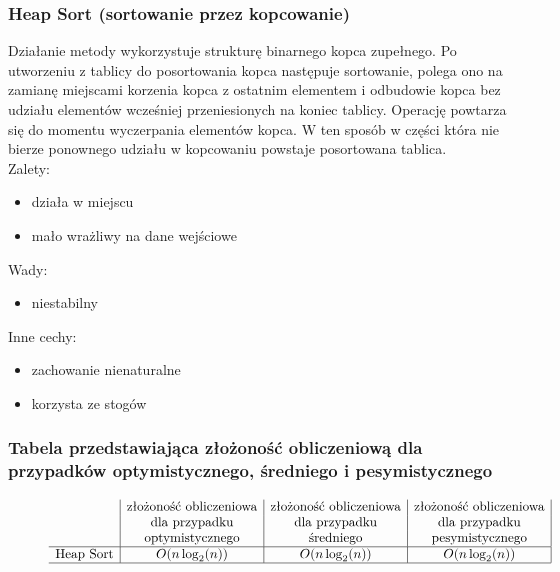 \documentclass[polish,polish,a4paper]{article}
\begin{document}
\begin{spacing}{1.5}
			\subsubsection*{Heap Sort (sortowanie przez kopcowanie)}
			Działanie metody wykorzystuje strukturę binarnego kopca zupełnego. Po utworzeniu z tablicy do posortowania kopca następuje sortowanie, polega ono na zamianę miejscami korzenia kopca z ostatnim elementem i odbudowie kopca bez udziału elementów wcześniej przeniesionych na koniec tablicy. Operację powtarza się do momentu wyczerpania elementów kopca. W ten sposób w części która nie bierze ponownego udziału w kopcowaniu powstaje posortowana tablica.\\
						
Zalety:
\begin{itemize}
	\item działa w miejscu
	\item  mało wrażliwy na dane wejściowe
\end{itemize}
Wady:
\begin{itemize}
	\item niestabilny

\end{itemize}
Inne cechy:
\begin{itemize}
	\item zachowanie nienaturalne
	\item korzysta ze stogów
\end{itemize}

\subsubsection*{Tabela przedstawiająca złożoność obliczeniową dla przypadków optymistycznego, średniego i pesymistycznego} 
\begin{figure}[H]
	
	\begin{equation*}
	\begin{array}{l|c|c|c|}

	&$złożoność obliczeniowa$&$złożoność obliczeniowa$&$złożoność obliczeniowa$\\
	&$dla przypadku$&$dla przypadku$&$dla przypadku$\\
	&$optymistycznego$&$średniego$&$pesymistycznego$\\
	\hline
	$Heap Sort$&O(n\log_{2}(n))&O(n\log_{2}(n))&O(n\log_{2}(n))\\
	\hline
	\end{array}
	\end{equation*}
\end{figure}


\end{spacing}
\end{document}
